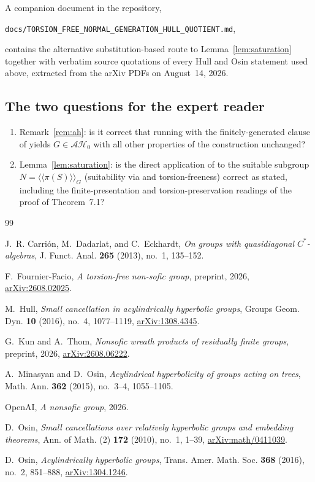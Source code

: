 \documentclass[11pt]{amsart}
\theoremstyle{remark}
\theoremstyle{definition}
\newcommand{\arxiv}[1]{\href{https://arxiv.org/abs/#1}{arXiv:#1}}
\newcommand{\ncl}[1]{\langle\!\langle #1\rangle\!\rangle}
\begin{document}
A companion document in the repository,
\begin{center}
\texttt{docs/TORSION\_FREE\_NORMAL\_GENERATION\_HULL\_QUOTIENT.md},
\end{center}
contains the alternative substitution-based route to
Lemma~\ref{lem:saturation} together with verbatim source quotations of
every Hull and Osin statement used above, extracted from the arXiv PDFs on
August~14, 2026.

\subsection*{The two questions for the expert reader}
\begin{enumerate}
\item Remark~\ref{rem:ah}: is it correct that running
  \cite[\S2]{FFF} with the finitely-generated clause of
  \cite[Corollary~7.4]{Hull16} yields $G\in\mathcal{AH}_0$ with all other
  properties of the construction unchanged?
\item Lemma~\ref{lem:saturation}: is the direct application of
  \cite[Corollary~5.7 and Theorem~7.1]{Hull16} to the suitable subgroup
  $N=\ncl{\pi(S)}_G$ (suitability via \cite[Lemma~7.1]{Osin16} and
  torsion-freeness) correct as stated, including the finite-presentation
  and torsion-preservation readings of the proof of Theorem~7.1?
\end{enumerate}

\begin{thebibliography}{99}

J.~R. Carri\'on, M.~Dadarlat, and C.~Eckhardt,
\emph{On groups with quasidiagonal $C^*$-algebras},
J. Funct. Anal. \textbf{265} (2013), no.~1, 135--152.

F.~Fournier-Facio,
\emph{A torsion-free non-sofic group},
preprint, 2026, \arxiv{2608.02025}.

M.~Hull,
\emph{Small cancellation in acylindrically hyperbolic groups},
Groups Geom. Dyn. \textbf{10} (2016), no.~4, 1077--1119,
\arxiv{1308.4345}.

G.~Kun and A.~Thom,
\emph{Nonsofic wreath products of residually finite groups},
preprint, 2026, \arxiv{2608.06222}.

A.~Minasyan and D.~Osin,
\emph{Acylindrical hyperbolicity of groups acting on trees},
Math. Ann. \textbf{362} (2015), no.~3--4, 1055--1105.

OpenAI,
\emph{A nonsofic group}, 2026.

D.~Osin,
\emph{Small cancellations over relatively hyperbolic groups and embedding
theorems},
Ann. of Math. (2) \textbf{172} (2010), no.~1, 1--39,
\arxiv{math/0411039}.

D.~Osin,
\emph{Acylindrically hyperbolic groups},
Trans. Amer. Math. Soc. \textbf{368} (2016), no.~2, 851--888,
\arxiv{1304.1246}.

\end{thebibliography}
\end{document}
